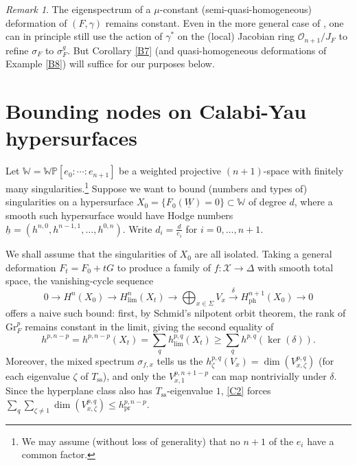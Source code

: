 \documentclass[12pt,letterpaper,english]{amsart}
\numberwithin{equation}{section}
\numberwithin{figure}{section}
\theoremstyle{plain}
\theoremstyle{remark}
\newtheorem{rem}[equation]{Remark}
\theoremstyle{definition}
\theoremstyle{definition}
\theoremstyle{plain}
\theoremstyle{plain}
\theoremstyle{plain}
\theoremstyle{plain}
\theoremstyle{definition}
\def\uh{\underline{h}}
\def\X{\mathcal{X}}
\def\co{\mathcal{O}}
\def\gr{\mathrm{Gr}}
\def\WW{\mathbb{W}}
\def\WP{\mathbb{WP}}
\def\UW{\underline{W}}
\theoremstyle{definition}
\begin{document}
\begin{rem}\label{B9}
The eigenspectrum of a $\mu$-constant (semi-quasi-\linebreak homogeneous) deformation of $(F,\gamma)$ remains constant.  Even in the more general case of \cite[\S5.2]{KL2}, one can in principle still use the action of $\gamma^*$ on the (local) Jacobian ring $\co_{n+1}/J_F$ to refine $\sigma_F$ to $\sigma_F^g$. But Corollary \ref{B7} (and quasi-homogeneous deformations of Example \ref{B8}) will suffice for our purposes below.
\end{rem}






\section{Bounding nodes on Calabi-Yau hypersurfaces}\label{S3}


Let $\WW=\WP[e_0:\cdots:e_{n+1}]$ be a weighted projective $(n+1)$-space with finitely many singularities.\footnote{We may assume (without loss of generality) that no $n+1$ of the $e_i$ have a common factor.} Suppose we want to bound (numbers and types of) singularities on a hypersurface $X_0=\{F_0(\UW)=0\}\subset \WW$ of degree $d$, where a smooth such hypersurface would have Hodge numbers $\uh=(h^{n,0},h^{n-1,1},\ldots ,h^{0,n})$.  Write $d_i=\tfrac{d}{e_i}$ for $i=0,\ldots,n+1$.

We shall assume that the singularities of $X_0$ are all isolated. Taking a general deformation $F_t=F_0+tG$ to produce a family of $f\colon \X\to \Delta$ with smooth total space, the vanishing-cycle sequence
\begin{equation}\label{C1}
0\to H^n(X_0)\to H^n_{\lim}(X_t)\to \textstyle\bigoplus_{x\in \Sigma}V_x \overset{\delta}{\to} H^{n+1}_{\text{ph}}(X_0)\to 0
\end{equation}
offers a naive such bound: first, by Schmid's nilpotent orbit theorem, the rank of $\gr_F^p$ remains constant in the limit, giving the second equality of 
\begin{equation}\label{C2}
h^{p,n-p}=h^{p,n-p}(X_t)=\textstyle\sum_q h^{p,q}_{\lim}(X_t)\geq \sum_q h^{p,q}(\ker(\delta)).	
\end{equation}
Moreover, the mixed spectrum $\sigma_{f,x}$ tells us the $h^{p,q}_{\zeta}(V_x)=\dim(V^{p,q}_{x,\zeta})$ (for each eigenvalue $\zeta$ of $T_{\text{ss}}$), and only the $V_{x,1}^{p,n+1-p}$ can map nontrivially under $\delta$.  Since the hyperplane class also has $T_{\text{ss}}$-eigenvalue $1$, \eqref{C2} forces $\sum_q\sum_{\zeta\neq 1}\dim(V^{p,q}_{x,\zeta})\leq h^{p,n-p}_{\text{pr}}$.
\end{document}

